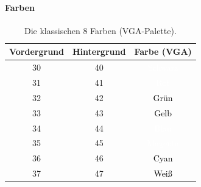 \paragraph{Farben}

\begin{table}[h]
  \centering
  \begin{tabular}{ccc}
    \toprule
    \textbf{Vordergrund} & \textbf{Hintergrund} & \textbf{Farbe (VGA)} \\
    \midrule
    30 & 40 & \cellcolor[RGB]{0,0,0}\textcolor{white}{Schwarz} \\
    31 & 41 & \cellcolor[RGB]{196,0,0}\textcolor{white}{Rot} \\
    32 & 42 & \cellcolor[RGB]{0,196,0}\textcolor{black}{Grün} \\
    33 & 43 & \cellcolor[RGB]{196,126,0}\textcolor{black}{Gelb} \\
    34 & 44 & \cellcolor[RGB]{0,0,196}\textcolor{white}{Blau} \\
    35 & 45 & \cellcolor[RGB]{196,0,196}\textcolor{white}{Magenta} \\
    36 & 46 & \cellcolor[RGB]{0,196,196}\textcolor{black}{Cyan} \\
    37 & 47 & \cellcolor[RGB]{196,196,196}\textcolor{black}{Weiß} \\
    \bottomrule
  \end{tabular}
  \caption{Die klassischen 8 Farben (VGA-Palette).}
  \label{tab:referenz::ansi-esc:farben}
\end{table}